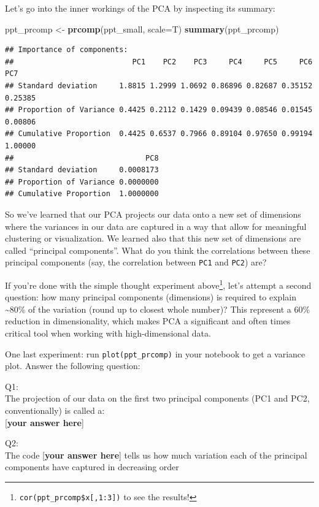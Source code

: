 \documentclass[]{article}
\newenvironment{Shaded}{\begin{snugshade}}{\end{snugshade}}
\newcommand{\DataTypeTok}[1]{\textcolor[rgb]{0.13,0.29,0.53}{#1}}
\newcommand{\KeywordTok}[1]{\textcolor[rgb]{0.13,0.29,0.53}{\textbf{#1}}}
\newcommand{\NormalTok}[1]{#1}
\newcommand{\StringTok}[1]{\textcolor[rgb]{0.31,0.60,0.02}{#1}}
\begin{document}
Let's go into the inner workings of the PCA by inspecting its summary:

\begin{Shaded}
\begin{Highlighting}[]
\NormalTok{ppt_prcomp <-}\StringTok{ }\KeywordTok{prcomp}\NormalTok{(ppt_small, }\DataTypeTok{scale=}\NormalTok{T)}
\KeywordTok{summary}\NormalTok{(ppt_prcomp)}
\end{Highlighting}
\end{Shaded}

\begin{verbatim}
## Importance of components:
##                           PC1    PC2    PC3     PC4     PC5     PC6     PC7
## Standard deviation     1.8815 1.2999 1.0692 0.86896 0.82687 0.35152 0.25385
## Proportion of Variance 0.4425 0.2112 0.1429 0.09439 0.08546 0.01545 0.00806
## Cumulative Proportion  0.4425 0.6537 0.7966 0.89104 0.97650 0.99194 1.00000
##                              PC8
## Standard deviation     0.0008173
## Proportion of Variance 0.0000000
## Cumulative Proportion  1.0000000
\end{verbatim}

So we've learned that our PCA projects our data onto a new set of
dimensions where the variances in our data are captured in a way that
allow for meaningful clustering or visualization. We learned also that
this new set of dimensions are called ``principal components''. What do
you think the correlations between these principal components (say, the
correlation between \texttt{PC1} and \texttt{PC2}) are?

If you're done with the simple thought experiment above\footnote{\texttt{cor(ppt\_prcomp\$x{[},1:3{]})}
  to see the results!}, let's attempt a second question: how many
principal components (dimensions) is required to explain
\textasciitilde{}80\% of the variation (round up to closest whole
number)? This represent a 60\% reduction in dimensionality, which makes
PCA a significant and often times critical tool when working with
high-dimensional data.

One last experiment: run \texttt{plot(ppt\_prcomp)} in your notebook to
get a variance plot. Answer the following question:

Q1:\\
The projection of our data on the first two principal components (PC1
and PC2, conventionally) is called a:\\
{[}\textbf{your answer here}{]}

Q2:\\
The code {[}\textbf{your answer here}{]} tells us how much variation
each of the principal components have captured in decreasing order
\end{document}

